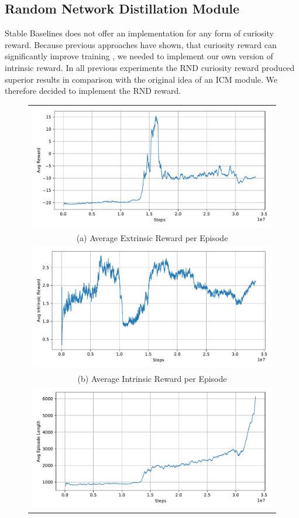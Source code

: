 \subsection{Random Network Distillation Module} \label{sec:blRND}
Stable Baselines does not offer an implementation for any form of curiosity reward. Because previous approaches have shown, that curiosity reward can significantly improve training \cite{huang2019}, we needed to implement our own version of intrinsic reward. In all previous experiments the RND curiosity reward produced superior results in comparison with the original idea of an ICM module. We therefore decided to implement the RND reward. 

\begin{figure}[htp]
    \begin{center}
    \begin{tabular}{c}
    \includegraphics[clip, width=0.7\columnwidth]{figures/implementation/rnd_pong_episode_reward.pdf} \\
    {\small (a) Average Extrinsic Reward per Episode} \\
    \addlinespace[0.4cm]
    \includegraphics[clip, width=0.7\columnwidth]{figures/implementation/rnd_pong_episode_intrinsic_reward.pdf} \\
    {\small (b) Average Intrinsic Reward per Episode} \\
    \addlinespace[0.4cm]
    \includegraphics[clip, width=0.7\columnwidth]{figures/implementation/rnd_pong_episode_length.pdf} \\

\end{tabular}
\end{center}
\end{figure}
